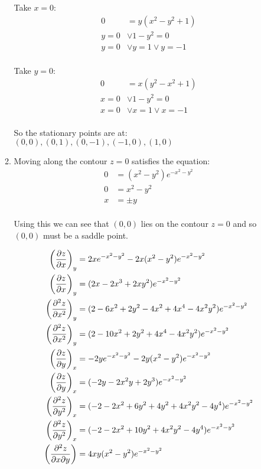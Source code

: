 \documentclass[10pt,\jkfside,a4paper]{article}
\begin{document}
\begin{enumerate}
\begin{enumerate}
Take $x = 0$:
\begin{equation}
\begin{split}
0 &= y(x^{2} - y^{2} + 1) \\
y = 0 &\vee 1 - y^{2} = 0 \\
y = 0 &\vee y = 1 \vee y = -1 \\
\end{split}
\end{equation}

Take $y = 0$:
\begin{equation}
\begin{split}
0 &= x(y^{2} - x^{2} + 1) \\
x = 0 &\vee 1 - y^{2} = 0 \\
x = 0 &\vee x = 1 \vee x = -1 \\
\end{split}
\end{equation}

So the stationary points are at:\\
$(0, 0), (0, 1), (0, -1), (-1, 0), (1, 0)$

\item Moving along the contour $z = 0$ satisfies the equation:
\begin{equation}
\begin{split}
0 &= (x^{2} - y^{2})e^{-x^{2} - y^{2}} \\
0 &= x^{2} - y^{2} \\
x &= \pm y \\
\end{split}
\end{equation}

Using this we can see that $(0, 0)$ lies on the contour $z = 0$ and so $(0, 0)$ must be 
a saddle point.

\begin{equation}
\begin{split}
\left(\pdv{z}{x}\right)_y &= 2xe^{-x^{2} - y^{2}} - 2x(x^{2} - y^{2})e^{-x^{2} - y^{2}} \\
\left(\pdv{z}{x}\right)_y &= (2x - 2x^3 + 2xy^{2})e^{-x^{2} - y^{2}} \\
\left(\pdv[2]{z}{x}\right)_y &= (2 - 6x^{2} + 2y^{2} - 4x^{2} + 4x^4 - 4x^{2}y^{2})e^{-x^{2} - y^{2}} \\
\left(\pdv[2]{z}{x}\right)_y &= (2 - 10x^{2} + 2y^{2} + 4x^4 - 4x^{2}y^{2})e^{-x^{2} - y^{2}} \\
\left(\pdv{z}{y}\right)_x &= -2ye^{-x^{2} - y^{2}} - 2y(x^{2} - y^{2})e^{-x^{2} - y^{2}} \\
\left(\pdv{z}{y}\right)_x &= (-2y - 2x^{2}y + 2y^3)e^{-x^{2} - y^{2}} \\
\left(\pdv[2]{z}{y}\right)_x &= (-2 - 2x^{2} + 6y^{2} + 4y^{2} + 4x^{2}y^{2} - 4y^4)e^{-x^{2} - y^{2}} \\
\left(\pdv[2]{z}{y}\right)_x &= (-2 - 2x^{2} + 10y^{2} + 4x^{2}y^{2} - 4y^4)e^{-x^{2} - y^{2}} \\
\left(\pdv[2]{z}{x}{y}\right) &= 4xy(x^{2} - y^{2})e^{-x^{2} - y^{2}} \\
\end{split}
\end{equation}


\end{enumerate}
\end{enumerate}
\end{document}
